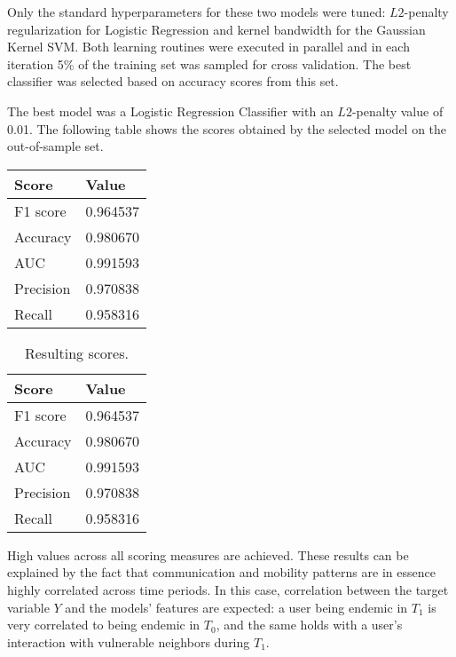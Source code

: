 Only the standard hyperparameters for these two models were tuned: $L2$-penalty regularization for Logistic Regression and kernel bandwidth for the Gaussian Kernel SVM.
Both learning routines were executed in parallel and in each iteration 5\% of the training set was sampled for cross validation. The best classifier was selected based on accuracy scores from this set.



The best model was a Logistic Regression Classifier with an $L2$-penalty value of 0.01. 
The following table
shows the scores obtained by the selected model on the out-of-sample set.

\begin{center}
	\begin{tabular}{ l l }
		\toprule
		Score & Value \\
		\midrule
		F1 score & 0.964537  \\
		Accuracy & 0.980670  \\
		AUC    & 0.991593  \\
		Precision & 0.970838  \\
		Recall  & 0.958316  \\
		\bottomrule
	\end{tabular}
\end{center}


\begin{table}[ht]
	\caption{Resulting scores.}
	\label{tab:results}
	\centering
	\begin{tabular}{ l l }
		\toprule
		Score & Value \\
		\midrule
		F1 score & 0.964537  \\
		Accuracy & 0.980670  \\
		AUC    & 0.991593  \\
		Precision & 0.970838  \\
		Recall  & 0.958316  \\
		\bottomrule
	\end{tabular}
\end{table}

High values across all scoring measures are achieved. %
These results can be explained by the fact that 
communication and mobility patterns are in essence highly correlated across time periods. 
In this case, correlation between the target variable $Y$ and the models' features are expected:
a user being endemic in $T_1$ is very correlated to being endemic in $T_0$, and the same holds with a user's interaction with vulnerable neighbors during $T_1$.


